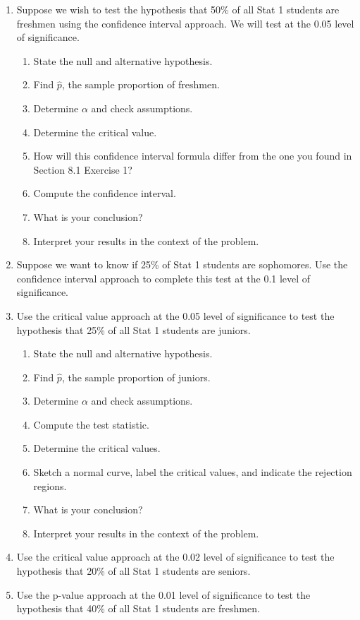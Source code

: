 \documentclass[
]{book}
\providecommand{\tightlist}{%
  \setlength{\itemsep}{0pt}\setlength{\parskip}{0pt}}
\begin{document}
\begin{enumerate}
\def\labelenumi{\arabic{enumi}.}
\tightlist
\item
  Suppose we wish to test the hypothesis that 50\% of all Stat 1 students are freshmen using the confidence interval approach. We will test at the 0.05 level of significance.

  \begin{enumerate}
  \def\labelenumii{\alph{enumii}.}
  \tightlist
  \item
    State the null and alternative hypothesis.
  \item
    Find \(\hat{p}\), the sample proportion of freshmen.
  \item
    Determine \(\alpha\) and check assumptions.
  \item
    Determine the critical value.
  \item
    How will this confidence interval formula differ from the one you found in Section 8.1 Exercise 1?
  \item
    Compute the confidence interval.
  \item
    What is your conclusion?
  \item
    Interpret your results in the context of the problem.
  \end{enumerate}
\item
  Suppose we want to know if 25\% of Stat 1 students are sophomores. Use the confidence interval approach to complete this test at the 0.1 level of significance.
\item
  Use the critical value approach at the 0.05 level of significance to test the hypothesis that 25\% of all Stat 1 students are juniors.

  \begin{enumerate}
  \def\labelenumii{\alph{enumii}.}
  \tightlist
  \item
    State the null and alternative hypothesis.
  \item
    Find \(\hat{p}\), the sample proportion of juniors.
  \item
    Determine \(\alpha\) and check assumptions.
  \item
    Compute the test statistic.
  \item
    Determine the critical values.
  \item
    Sketch a normal curve, label the critical values, and indicate the rejection regions.
  \item
    What is your conclusion?
  \item
    Interpret your results in the context of the problem.
  \end{enumerate}
\item
  Use the critical value approach at the 0.02 level of significance to test the hypothesis that 20\% of all Stat 1 students are seniors.
\item
  Use the p-value approach at the 0.01 level of significance to test the hypothesis that 40\% of all Stat 1 students are freshmen.


\end{enumerate}
\end{document}
